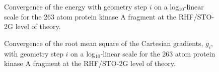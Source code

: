 \documentclass[prl,aps,preprint,showpacs,superbib]{revtex4}
\begin{document}
{\begin{figure}[h]
\caption{
Convergence of the energy with geometry step $i$ on a log$_{10}$-linear  scale for the 
263 atom protein kinase A fragment at the RHF/STO-2G level of theory.}\label{logn-logde} 
\end{figure}

\begin{figure}[h]
\caption{
Convergence of the root mean square of the Cartesian gradients, $g_{i}$,
with geometry step $i$ on a log$_{10}$-linear  scale for the 
263 atom protein kinase A fragment at the RHF/STO-2G level of theory.}\label{gradientpicture} 
\end{figure}

}
\end{document}

